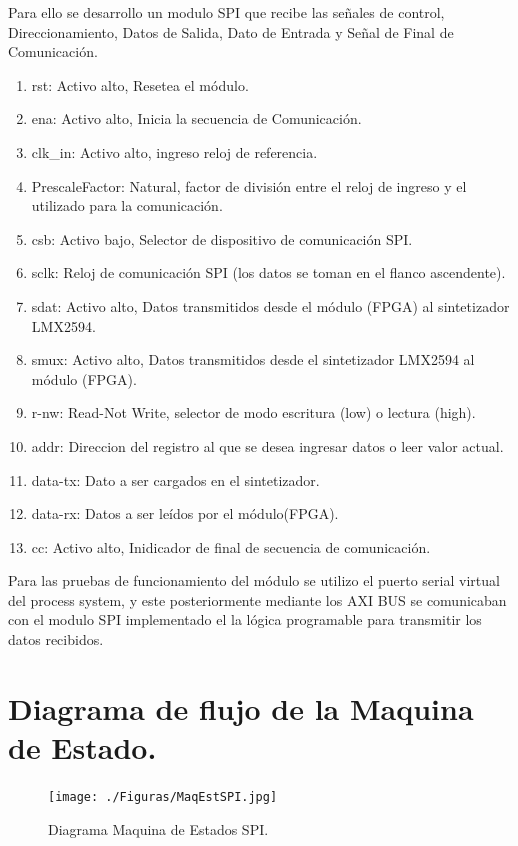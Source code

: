 \documentclass[
11pt, %
]{charter}
\begin{document}
Para ello se desarrollo un modulo SPI que recibe las señales de control, Direccionamiento, Datos de Salida, Dato de Entrada y Señal de Final de Comunicación.

\begin{enumerate}
	\item rst: Activo alto, Resetea el módulo.
	\item ena: Activo alto, Inicia la secuencia de Comunicación.   
	\item clk\_in: Activo alto, ingreso reloj de referencia.
	\item PrescaleFactor: Natural, factor de división entre el reloj de ingreso y el utilizado para la comunicación.
	\item csb: Activo bajo, Selector de dispositivo de comunicación SPI.   
	\item sclk: Reloj de comunicación SPI (los datos se toman en el flanco ascendente).  
	\item sdat: Activo alto, Datos transmitidos desde el módulo (FPGA) al sintetizador LMX2594.   
	\item smux: Activo alto, Datos transmitidos desde el sintetizador LMX2594 al módulo (FPGA). 
	\item r-nw: Read-Not Write, selector de modo escritura (low) o lectura (high).
	\item addr: Direccion del registro al que se desea ingresar datos o leer valor actual.
	\item data-tx: Dato a ser cargados en el sintetizador.
	\item data-rx: Datos a ser leídos por el módulo(FPGA).
	\item cc: Activo alto, Inidicador de final de secuencia de comunicación.
\end{enumerate}

Para las pruebas de funcionamiento del módulo se utilizo el puerto serial virtual del process system, y este posteriormente mediante los AXI BUS se comunicaban con el modulo SPI implementado el la lógica programable para transmitir los datos recibidos.



\section{Diagrama de flujo de la Maquina de Estado.}
\label{sec:orgfd5391f}

\begin{figure}[htpb]
\centering 
\texttt{[image: ./Figuras/MaqEstSPI.jpg]}
\caption{Diagrama Maquina de Estados SPI.}
\label{fig:diagBloques}
\end{figure}
\end{document}

